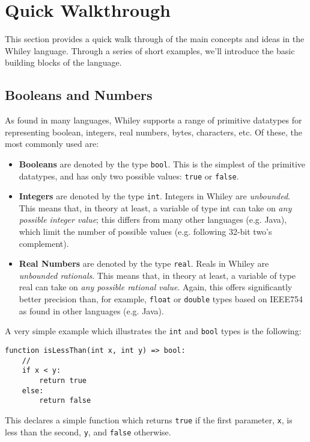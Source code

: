 \newpage
\section{Quick Walkthrough}
This section provides a quick walk through of the main concepts and
ideas in the Whiley language.  Through a series of short examples,
we'll introduce the basic building blocks of the language.

\subsection{Booleans and Numbers}

As found in many languages, Whiley supports a range of primitive
datatypes for representing boolean, integers, real numbers, bytes,
characters, etc.  Of these, the most commonly used are:

\begin{itemize}
\item {\bf Booleans} are denoted by the type \lstinline{bool}.  This is the
  simplest of the primitive datatypes, and has only two possible
  values: \lstinline{true} or \lstinline{false}.
\item {\bf Integers} are denoted by the type \lstinline{int}.  Integers in
  Whiley are {\em unbounded}. This means that, in theory at least, a
  variable of type int can take on {\em any possible integer value};
  this differs from many other languages (e.g. Java), which limit the
  number of possible values (e.g. following 32-bit two's complement).
\item {\bf Real Numbers} are denoted by the type
  \lstinline{real}. Reals in Whiley are {\em unbounded
    rationals}. This means that, in theory at least, a variable of
  type real can take on {\em any possible rational value}. Again, this
  offers significantly better precision than, for example,
  \lstinline{float} or \lstinline{double} types based on IEEE754 as
  found in other languages (e.g. Java).
\end{itemize}

\begin{eg}
\noindent A very simple example which illustrates the \lstinline{int} and
\lstinline{bool} types is the following:
\begin{lstlisting}
function isLessThan(int x, int y) => bool:
    //
    if x < y:
        return true
    else:
        return false
\end{lstlisting}
This declares a simple function which returns \lstinline{true} if the
first parameter, \lstinline{x}, is less than the second,
\lstinline{y}, and \lstinline{false} otherwise.
\end{eg}

